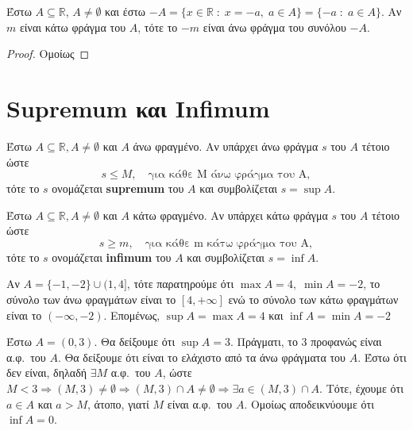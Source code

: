 \begin{mybox3}
\begin{prop}
  Έστω $ A \subseteq \mathbb{R}$, $A \neq \emptyset $ και έστω 
  $ -A = \{ x \in \mathbb{R} \; : \; x = -a, \; a \in A \} = \{ 
  -a \; : \; a \in A\} $. Αν $m$ είναι κάτω  φράγμα 
  του $A$, τότε το $ -m $ είναι άνω  φράγμα του συνόλου $ -A $.
\end{prop}
\end{mybox3}
\begin{proof}
Ομοίως  
\end{proof}


\section{Supremum και Infimum}

\begin{mybox1}
\begin{dfn}
  Έστω $ A \subseteq \mathbb{R}, A \neq \emptyset $ και $A$ άνω 
  φραγμένο. Αν υπάρχει άνω φράγμα $s$ του $A$ τέτοιο ώστε 
  \[
    s \leq M, \quad \text{για κάθε M άνω φράγμα του A}, 
  \] 
  τότε το $s$ ονομάζεται \textbf{supremum} του $A$ και συμβολίζεται $ s=\sup A $.
\end{dfn}
\end{mybox1}

\begin{mybox1}
\begin{dfn}
  Έστω $ A \subseteq \mathbb{R}, A \neq \emptyset $ και $A$ κάτω 
  φραγμένο. Αν υπάρχει κάτω φράγμα $s$ του $A$ τέτοιο ώστε 
  \[
    s \geq m, \quad \text{για κάθε m κάτω φράγμα του A}, 
  \] 
  τότε το $s$ ονομάζεται \textbf{infimum} του $A$ και συμβολίζεται $ s=\inf A $.
\end{dfn}
\end{mybox1}

\begin{example}
  Αν $ A= \{ -1,-2 \} \cup (1,4] $, τότε παρατηρούμε ότι $ \max A = 4, \; \min A =-2 $,
  το σύνολο των άνω φραγμάτων είναι το $ [4,+\infty] $ ενώ το σύνολο των κάτω φραγμάτων
  είναι το $ (-\infty,-2) $. Επομένως, $ \sup A= \max A=4 $ και 
  $ \inf A = \min A= -2 $
\end{example}

\begin{example}
  Έστω $ A = (0,3) $. Θα δείξουμε ότι $ \sup A = 3 $. Πράγματι, 
  το $ 3 $ προφανώς είναι α.φ.\ του $A$. Θα δείξουμε ότι είναι το
  ελάχιστο από τα άνω φράγματα του $A$. Έστω ότι δεν είναι, δηλαδή 
  $ \exists M $ α.φ.\ του $A$, ώστε $ M < 3 \Rightarrow (M,3) \neq 
  \emptyset \Rightarrow (M,3) \cap A \neq \emptyset \Rightarrow \exists 
  a \in (M,3) \cap A $. Τότε, έχουμε ότι $ a \in A $ και $ a > M $, 
  άτοπο, γιατί $M$ είναι α.φ.\ του $A$. Ομοίως αποδεικνύουμε ότι $ 
  \inf A = 0$.
\end{example}

